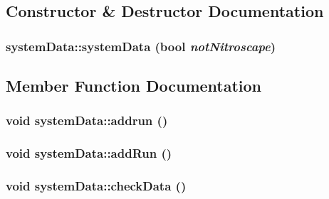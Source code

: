 \subsection{Constructor \& Destructor Documentation}
\hypertarget{classsystem_data_a2aa6ac7104d8b19fabd199b0c55dd0f5}{
\subsubsection[{systemData}]{\setlength{\rightskip}{0pt plus 5cm}systemData::systemData (bool {\em notNitroscape})}}
\label{classsystem_data_a2aa6ac7104d8b19fabd199b0c55dd0f5}


\subsection{Member Function Documentation}
\hypertarget{classsystem_data_a9c1ad6641a931ce8e3e232e61e0b8b32}{
\subsubsection[{addrun}]{\setlength{\rightskip}{0pt plus 5cm}void systemData::addrun ()}}
\label{classsystem_data_a9c1ad6641a931ce8e3e232e61e0b8b32}
\hypertarget{classsystem_data_aa29d606df487daec256e0626edecc9cb}{
\subsubsection[{addRun}]{\setlength{\rightskip}{0pt plus 5cm}void systemData::addRun ()}}
\label{classsystem_data_aa29d606df487daec256e0626edecc9cb}
\hypertarget{classsystem_data_ad11a516464effcc5ef9a582534a3e351}{
\subsubsection[{checkData}]{\setlength{\rightskip}{0pt plus 5cm}void systemData::checkData ()}}
